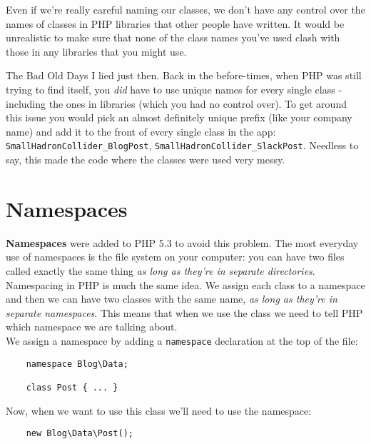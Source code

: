 Even if we're really careful naming our classes, we don't have any control over the names of classes in PHP libraries that other people have written. It would be unrealistic to make sure that none of the class names you've used clash with those in any libraries that you might use.


\begin{infobox}{The Bad Old Days}
    I lied just then. Back in the before-times, when PHP was still trying to find itself, you \textit{did} have to use unique names for every single class - including the ones in libraries (which you had no control over). To get around this issue you would pick an almost definitely unique prefix (like your company name) and add it to the front of every single class in the app: \texttt{SmallHadronCollider\_BlogPost}, \texttt{SmallHadronCollider\_SlackPost}. Needless to say, this made the code where the classes were used very messy.
\end{infobox}



\section{Namespaces}

\textbf{Namespaces} were added to PHP 5.3 to avoid this problem. The most everyday use of namespaces is the file system on your computer: you can have two files called exactly the same thing \textit{as long as they're in separate directories}.
\\

Namespacing in PHP is much the same idea. We assign each class to a namespace and then we can have two classes with the same name, \textit{as long as they're in separate namespaces}. This means that when we use the class we need to tell PHP which namespace we are talking about.
\\

We assign a namespace by adding a \texttt{namespace} declaration at the top of the file:

\begin{verbatim}
    namespace Blog\Data;

    class Post { ... }
\end{verbatim}

Now, when we want to use this class we'll need to use the namespace:

\begin{verbatim}
    new Blog\Data\Post();
\end{verbatim}


